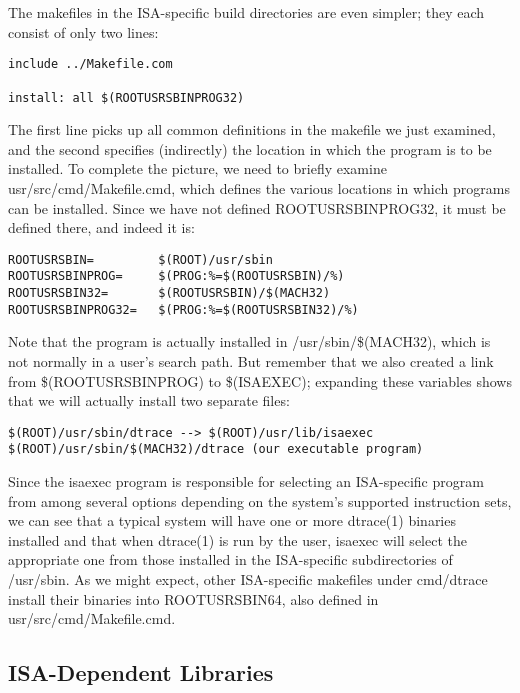 \documentclass{article}
\begin{document}
The makefiles in the ISA-specific build directories are even simpler; they each
consist of only two lines:

\begin{verbatim}
include ../Makefile.com

install: all $(ROOTUSRSBINPROG32)
\end{verbatim}

\vspace{0.2cm}
The first line picks up all common definitions in the makefile we just examined,
and the second specifies (indirectly) the location in which the program is to be
installed. To complete the picture, we need to briefly examine
usr/src/cmd/Makefile.cmd, which defines the various locations in which programs
can be installed. Since we have not defined ROOTUSRSBINPROG32, it must be
defined there, and indeed it is:

\begin{verbatim}
ROOTUSRSBIN=         $(ROOT)/usr/sbin
ROOTUSRSBINPROG=     $(PROG:%=$(ROOTUSRSBIN)/%)
ROOTUSRSBIN32=       $(ROOTUSRSBIN)/$(MACH32)
ROOTUSRSBINPROG32=   $(PROG:%=$(ROOTUSRSBIN32)/%)
\end{verbatim}

Note that the program is actually installed in /usr/sbin/\$(MACH32), which is
not normally in a user's search path. But remember that we also created a link
from \$(ROOTUSRSBINPROG) to \$(ISAEXEC); expanding these variables shows that we
will actually install two separate files:

\begin{verbatim}
$(ROOT)/usr/sbin/dtrace --> $(ROOT)/usr/lib/isaexec
$(ROOT)/usr/sbin/$(MACH32)/dtrace (our executable program)
\end{verbatim}

Since the isaexec program is responsible for selecting an ISA-specific program
from among several options depending on the system's supported instruction
sets, we can see that a typical system will have one or more dtrace(1) binaries
installed and that when dtrace(1) is run by the user, isaexec will select the
appropriate one from those installed in the ISA-specific subdirectories of
/usr/sbin. As we might expect, other ISA-specific makefiles under cmd/dtrace
install their binaries into ROOTUSRSBIN64, also defined in
usr/src/cmd/Makefile.cmd.

\subsection*{ISA-Dependent Libraries}
\end{document}
